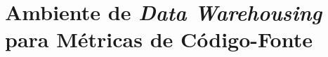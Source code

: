 \chapter{Ambiente de \textit{Data Warehousing} para Métricas de Código-Fonte}
\label{chap:arquitetura}

